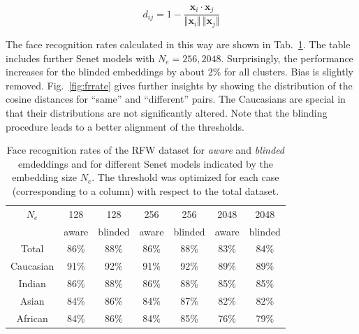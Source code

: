 \documentclass{report}
\begin{document}
\begin{equation}
\label{eq:cos}
	d_{ij} = 1 - \frac{\bm{x}_i\cdot \bm{x}_j}{\Vert \bm{x}_i \Vert\,\Vert \bm{x}_j \Vert }
\end{equation} 

\noindent The face recognition rates calculated in this way are shown in  Tab.~\ref{tab:frrate}. The table includes further Senet models with $N_e=256, 2048$. Surprisingly, the performance increases for the blinded embeddings by about 2\% for all clusters. Bias is slightly removed.  Fig.~\ref{fig:frrate} gives further insights by showing the distribution of the cosine distances for ``same'' and ``different'' pairs. The Caucasians are special in that their distributions are not significantly altered. Note that the blinding procedure leads to a better alignment of the thresholds. 


\begin{table}
\begin{center}
\begin{tabular}{ c|c|c || c|c || c|c }
$N_e$ & 128 & 128 & 256 & 256 & 2048 & 2048 \\
        & aware  & blinded  & aware  & blinded  & aware  & blinded  \\
\hline
Total & 86\% & 88\%           &  86\% & 88\%    &  83\% & 84\%  \\ 
\hline
Caucasian & 91\% & 92\%    &  91\% & 92\%    &  89\% & 89\% \\  
Indian & 86\% & 88\%          &  86\% & 88\%    &  85\% & 85\%\\ 
Asian & 84\% & 86\%           &  84\% & 87\%    &  82\% & 82\%\\ 
African & 84\% &    86\%      &  84\% & 85\%    &  76\% & 79\% 
\end{tabular}
\end{center}
\caption{Face recognition rates of the RFW dataset for \emph{aware}  and  \emph{blinded} emdeddings and for different Senet models indicated by the embedding size $N_e$. The threshold was optimized for each case (corresponding to a column) with respect to the total dataset.}
\label{tab:frrate}
\end{table}
\end{document}
